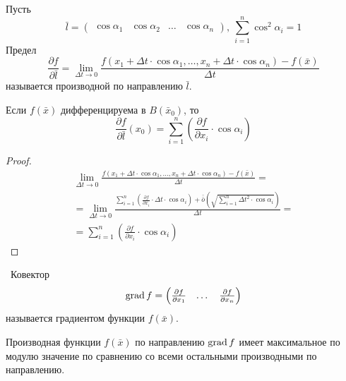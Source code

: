 \begin{definition}
    Пусть
    \[\bar{l}=\begin{pmatrix}
        \cos{\alpha_1} & \cos{\alpha_2} & \dots & \cos{\alpha_n}
    \end{pmatrix},\
    \sum\limits_{i=1}^{n}\cos^2{\alpha_i}=1
    \]
    Предел
    \[\frac{\partial {f}}{\partial {\bar{l}}}=\lim\limits_{\Delta t\to 0}\frac{f(x_1+\Delta t \cdot \cos{\alpha_1},\dots,x_n+\Delta t \cdot \cos{\alpha_n})-f(\bar{x})}{\Delta t}\]
    называется производной по направлению $\bar{l}$.
\end{definition} 
\begin{theorem}
    Если $f(\bar{x})$ дифференцируема в $B(\bar{x}_0)$, то
    \[\frac{\partial {f}}{\partial {\bar{l}}}(x_0)=\sum\limits_{i=1}^{n}\left(\frac{\partial {f}}{\partial {x_i}}\cdot \cos{\alpha_i}\right)\]
\end{theorem} 
\begin{proof}
    \begin{multline*}
        \lim\limits_{\Delta t\to 0}\frac{f(x_1+\Delta t \cdot \cos{\alpha_1},\dots,x_n+\Delta t \cdot \cos{\alpha_n})-f(\bar{x})}{\Delta t}=\\
        =\lim\limits_{\Delta t\to 0}\frac{\sum\limits_{i=1}^{n}\left(\frac{\partial {f}}{\partial {x_i}}\cdot \Delta t\cdot \cos{\alpha_i}\right)+\bar{\bar{o}}{\left(\sqrt{\sum\limits_{i=1}^{n}\Delta t^2\cdot \cos{\alpha_i}}\right)}}{\Delta t}=\\
        =\sum\limits_{i=1}^{n}\left( \frac{\partial {f}}{\partial {x_i}}\cdot \cos{\alpha_i}\right)
    \end{multline*}
\end{proof}
\begin{definition}\
    Ковектор
    \[
    \operatorname*{grad}{f}=\begin{pmatrix}
        \frac{\partial {f}}{\partial {x_1}} & \dots & \frac{\partial {f}}{\partial {x_n}}
    \end{pmatrix}
    \]
    называется градиентом функции $f(\bar{x})$.
\end{definition} 
\begin{theorem}
    Производная функции $f(\bar{x})$ по направлению $\operatorname*{grad}{f}$ имеет максимальное по модулю значение по сравнению со всеми остальными производными по направлению.
\end{theorem} 
